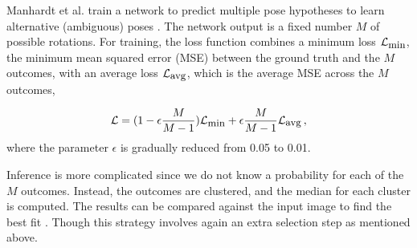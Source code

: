 Manhardt et al. train a network to predict multiple pose hypotheses to learn alternative (ambiguous) poses \cite{manhardt2019}. The network output is a fixed number $M$ of possible rotations. For training, the loss function combines a minimum loss $\mathcal{L}_{\mbox{\small min}}$, the minimum mean squared error (MSE) between the ground truth and the $M$ outcomes, with an average loss $\mathcal{L}_{\mbox{\small avg}}$, which is the average MSE across the $M$ outcomes,

\begin{equation}\label{eq:M-loss}
\mathcal{L} = (1-\epsilon \frac{M}{M-1}) \mathcal{L}_{\mbox{\small min}} + \epsilon \frac{M}{M-1}  \mathcal{L}_{\mbox{\small avg}}\,,
\end{equation}
%
where the parameter $\epsilon$ is gradually reduced from 0.05 to 0.01.

Inference is more complicated since we do not know a probability for each of the $M$ outcomes. Instead, the outcomes are clustered, and the median for each cluster is computed. The results can be compared against the input image to find the best fit  \cite{manhardt2019}. Though this strategy involves again an extra selection step as mentioned above.